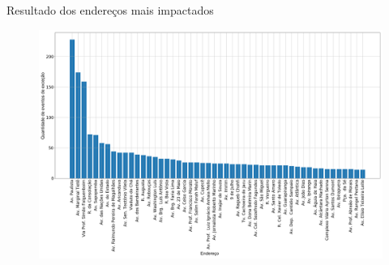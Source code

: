 \documentclass{beamer}
\begin{document}
\begin{frame}{Resultado dos endereços mais impactados}
    \begin{figure}[!htb]%
	\centering
		\includegraphics[width=1\linewidth]{address_analysis_pt.png}
	\label{fig:pizza_bus}
\end{figure}
\end{frame}
\end{document}
